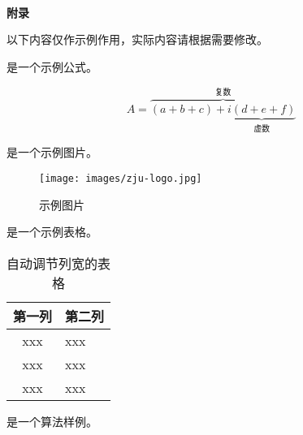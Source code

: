 \newpage
{}
\begin{center}
    ~\\[-1.5em]
    \textbf{附\quad 录}
\end{center}


\setcounter{section}{1}
\renewcommand{\thesection}{A\arabic{section}}

\par 以下内容仅作示例作用，实际内容请根据需要修改。

\par {} 是一个示例公式。

\begin{equation}
  \label{equ:sample}
  A=\overbrace{(a+b+c)+\underbrace{i(d+e+f)}_{\text{虚数}}}^{\text{复数}}
\end{equation}

\par {} 是一个示例图片。

\begin{figure}[htbp]
  \centering
  \texttt{[image: images/zju-logo.jpg]}
  \caption{\label{fig:sample}示例图片}
\end{figure}

\par {} 是一个示例表格。

\begin{table}[htbp]
  \caption{\label{tab:sample}自动调节列宽的表格}
  \begin{tabularx}{\linewidth}{c|X<{\centering}}
      \hline
      第一列 & 第二列 \\ \hline
      xxx & xxx \\ \hline
      xxx & xxx \\ \hline
      xxx & xxx \\ \hline
  \end{tabularx}
\end{table}

\par {} 是一个算法样例。

